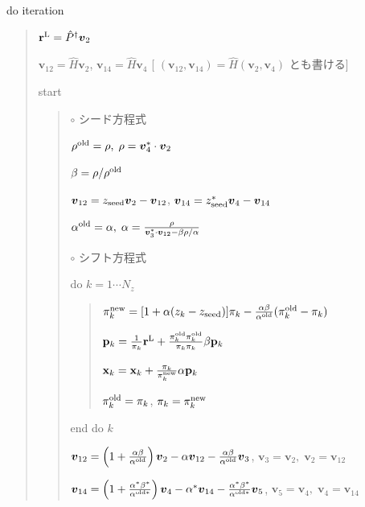 \documentclass[letterpaper,10pt,dvipdfmx,openany]{sphinxmanual}
\begin{document}
do iteration
\begin{quote}

\({\bf r}^{\rm L} = {\hat P}^\dagger {\boldsymbol v}_2\)

\({\boldsymbol v}_{1 2} = {\hat H} {\boldsymbol v}_2\),
\({\boldsymbol v}_{1 4} = {\hat H} {\boldsymbol v}_4\)
{[} \(({\boldsymbol v}_{1 2}, {\boldsymbol v}_{1 4}) = {\hat H} ({\boldsymbol v}_2, {\boldsymbol v}_4)\) とも書ける{]}

 start
\begin{quote}

\(\circ\) シード方程式

\(\rho^{\rm old} = \rho,\; \rho = {\boldsymbol v}_4^* \cdot {\boldsymbol v}_2\)

\(\beta = \rho / \rho^{\rm old}\)

\({\boldsymbol v}_{1 2} = z_{\rm seed} {\boldsymbol v}_2 - {\boldsymbol v}_{1 2}\),
\({\boldsymbol v}_{1 4} = z_{\rm seed}^* {\boldsymbol v}_4 - {\boldsymbol v}_{1 4}\)

\(\alpha^{\rm old} = \alpha,\; \alpha = \frac{\rho}{{\boldsymbol v}_3^* \cdot {\boldsymbol v}_{1 2} - \beta \rho / \alpha }\)

\(\circ\) シフト方程式

do \(k = 1 \cdots N_z\)
\begin{quote}

\(\pi_k^{\rm new} = [1+\alpha(z_k-z_{\rm seed})]\pi_k - \frac{\alpha \beta}{\alpha^{\rm old}}(\pi_k^{\rm old} - \pi_k)\)

\({\bf p}_{k} = \frac{1}{\pi_k} {\bf r}^{\rm L} + \frac{\pi^{\rm old}_k \pi^{\rm old}_k}{\pi_k \pi_k} \beta {\bf p}_{k}\)

\({\bf x}_{k} = {\bf x}_{k} + \frac{\pi_k}{\pi_k^{\rm new}} \alpha {\bf p}_{k}\)

\(\pi_k^{\rm old} = \pi_k\), \(\pi_k = \pi_k^{\rm new}\)
\end{quote}

end do \(k\)

\({\boldsymbol v}_{1 2} = \left( 1 + \frac{\alpha \beta}{\alpha^{\rm old}} \right) {\boldsymbol v}_2 - \alpha {\boldsymbol v}_{1 2} - \frac{\alpha \beta}{\alpha^{\rm old}} {\boldsymbol v}_3\),
\({\boldsymbol v}_3 = {\boldsymbol v}_2,\; {\boldsymbol v}_2 = {\boldsymbol v}_{1 2}\)

\({\boldsymbol v}_{1 4} = \left( 1 + \frac{\alpha^* \beta^*}{\alpha^{{\rm old}*}} \right) {\boldsymbol v}_4 - \alpha^* {\boldsymbol v}_{1 4} - \frac{\alpha^* \beta^*}{\alpha^{{\rm old} *}} {\boldsymbol v}_5\),
\({\boldsymbol v}_5 = {\boldsymbol v}_4,\; {\boldsymbol v}_4 = {\boldsymbol v}_{1 4}\)


\end{quote}
\end{quote}
\end{document}
